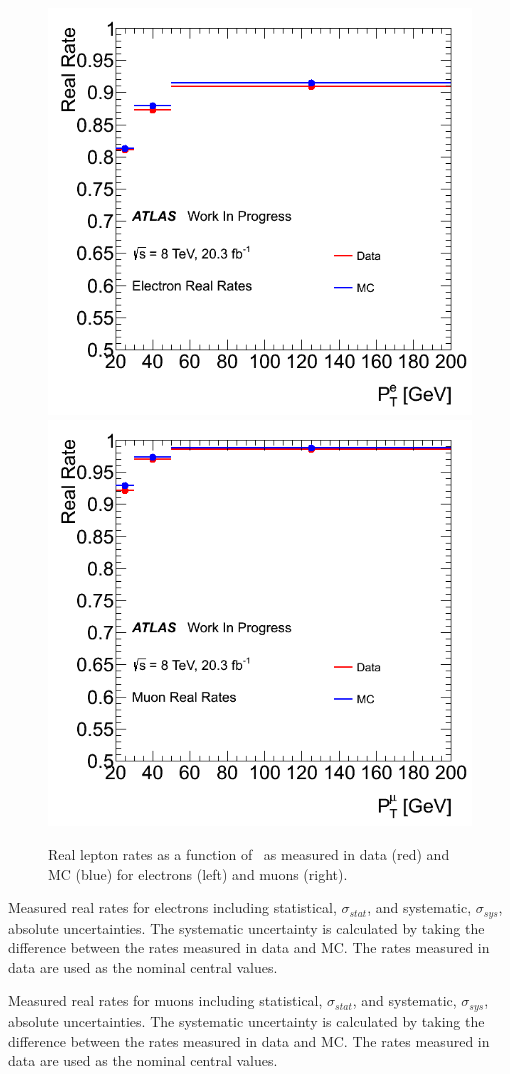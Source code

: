 \begin{figure}[ht!]
\centering
\includegraphics[width=0.495\columnwidth]{figures/fakes_bkg/Efficiencies/ElectronRealRates.png}
\includegraphics[width=0.495\columnwidth]{figures/fakes_bkg/Efficiencies/MuonRealRates.png}
\caption{Real lepton rates as a function of \pt\ as measured in data (red) and MC (blue) for electrons (left) and muons (right).}
\label{fig:realEff}
\end{figure}


\begin{table}[ht!]
\centering

\caption{Measured real rates for electrons including statistical, $\sigma_{stat}$,
and systematic, $\sigma_{sys}$, absolute uncertainties. 
The systematic uncertainty is calculated by taking the difference
between the rates measured in data and MC.  The rates measured in data are used as the nominal central values.  } 
\label{tab:realEff_El}
\end{table} 

\begin{table}[ht!]
\centering

\caption{Measured real rates for muons including statistical, $\sigma_{stat}$,
and systematic, $\sigma_{sys}$, absolute uncertainties. 
The systematic uncertainty is calculated by taking the difference
between the rates measured in data and MC.  The rates measured in data are used as the nominal central values.  } 
\label{tab:realEff_Mu}
\end{table} 



